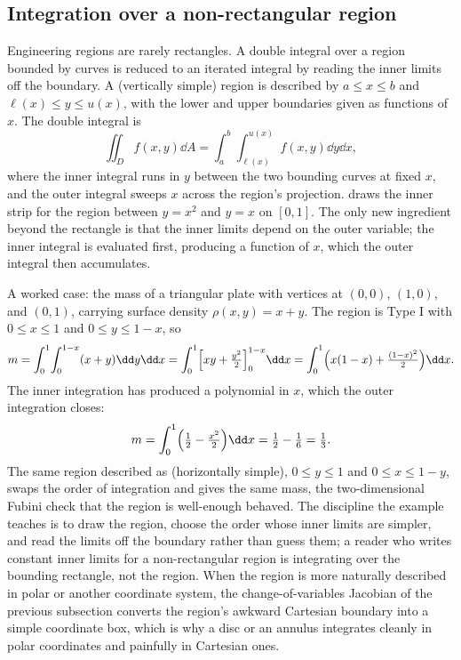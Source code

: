 \subsection{Integration over a non-rectangular region}

Engineering regions are rarely rectangles. A double integral over a
region bounded by curves is reduced to an iterated integral by reading
the inner limits off the boundary. A  (vertically
simple) region is described by $a \leq x \leq b$ and $\ell(x) \leq y
\leq u(x)$, with the lower and upper boundaries given as functions of
$x$. The double integral is
\[
\iint_{D} f(x, y)\dd A = \int_{a}^{b}\!\int_{\ell(x)}^{u(x)} f(x, y)
\dd y\dd x,
\]
where the inner integral runs in $y$ between the two bounding curves at
fixed $x$, and the outer integral sweeps $x$ across the region's
projection.
 draws the inner strip for
the region between $y = x^{2}$ and $y = x$ on $[0, 1]$. The only new
ingredient beyond the rectangle is that the inner limits depend on the
outer variable; the inner integral is evaluated first, producing a
function of $x$, which the outer integral then accumulates.

A worked case: the mass of a triangular plate with vertices at $(0,0)$,
$(1, 0)$, and $(0, 1)$, carrying surface density $\rho(x, y) = x + y$.
The region is Type I with $0 \leq x \leq 1$ and $0 \leq y \leq 1 - x$,
so
\[
m = \int_{0}^{1}\!\int_{0}^{1 - x}(x + y)\dd y\dd x =
\int_{0}^{1}\Bigl[xy + \tfrac{y^{2}}{2}\Bigr]_{0}^{1 - x}\dd x =
\int_{0}^{1}\Bigl(x(1 - x) + \tfrac{(1 - x)^{2}}{2}\Bigr)\dd x.
\]
The inner integration has produced a polynomial in $x$, which the outer
integration closes:
\[
m = \int_{0}^{1}\Bigl(\tfrac{1}{2} - \tfrac{x^{2}}{2}\Bigr)\dd x =
\tfrac{1}{2} - \tfrac{1}{6} = \tfrac{1}{3}.
\]
The same region described as  (horizontally simple),
$0 \leq y \leq 1$ and $0 \leq x \leq 1 - y$, swaps the order of
integration and gives the same mass, the two-dimensional Fubini check
that the region is well-enough behaved. The discipline the example
teaches is to draw the region, choose the order whose inner limits are
simpler, and read the limits off the boundary rather than guess them; a
reader who writes constant inner limits for a non-rectangular region is
integrating over the bounding rectangle, not the region. When the
region is more naturally described in polar or another coordinate
system, the change-of-variables Jacobian of the previous subsection
converts the region's awkward Cartesian boundary into a simple
coordinate box, which is why a disc or an annulus integrates cleanly in
polar coordinates and painfully in Cartesian ones.


